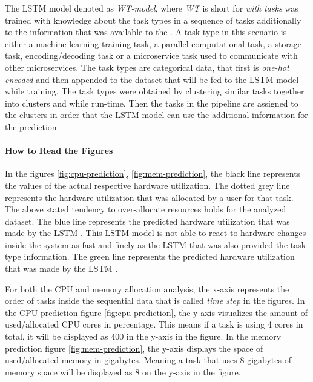 \documentclass{article}
\begin{document}
    The LSTM model denoted as \emph{WT-model}, where \emph{WT} is short for \emph{with tasks} was trained with knowledge about the task types in a sequence of tasks additionally to the information
    that was available to the .
    A task type in this scenario is either a machine learning training task, a parallel computational task, 
    a storage task, encoding/decoding task or a microservice task used to communicate with other microservices.
    The task types are categorical data, that first is \emph{one-hot encoded} \cite{seger2018investigation} \cite{yu2022missing} and then appended to the dataset that will be fed to the LSTM model while training.
    The task types were obtained by clustering similar tasks together into clusters and while run-time.
    Then the tasks in the pipeline are assigned to the clusters in order that the LSTM model can use the additional information for the prediction.

  \paragraph{How to Read the Figures}
  \label{par:how-to-read-figures}

    In the figures \ref{fig:cpu-prediction}, \ref{fig:mem-prediction}, the black line represents the values of the actual respective hardware utilization.
    The dotted grey line represents the hardware utilization that was allocated by a user for that task. The above stated tendency to over-allocate resources holds for the analyzed dataset. 
    The blue line represents the predicted hardware utilization that was made by the LSTM .
    This LSTM model is not able to react to hardware changes inside the system as fast and finely as the LSTM that was also provided the task type information.
    The green line represents the predicted hardware utilization that was made by the LSTM .

    For both the CPU and memory allocation analysis, the x-axis represents the order of tasks inside the sequential data that is called \emph{time step} in the figures.
    In the CPU prediction figure \ref{fig:cpu-prediction}, the y-axis visualizes the amount of used/allocated CPU cores in percentage. This means if a task is using 4 cores in total, it will be displayed as $400$ in the y-axis in the figure.
    In the memory prediction figure \ref{fig:mem-prediction}, the y-axis displays the space of used/allocated memory in gigabytes. Meaning a task that uses $8$ gigabytes of memory space will be displayed as $8$ on the y-axis in the figure.
\end{document}
